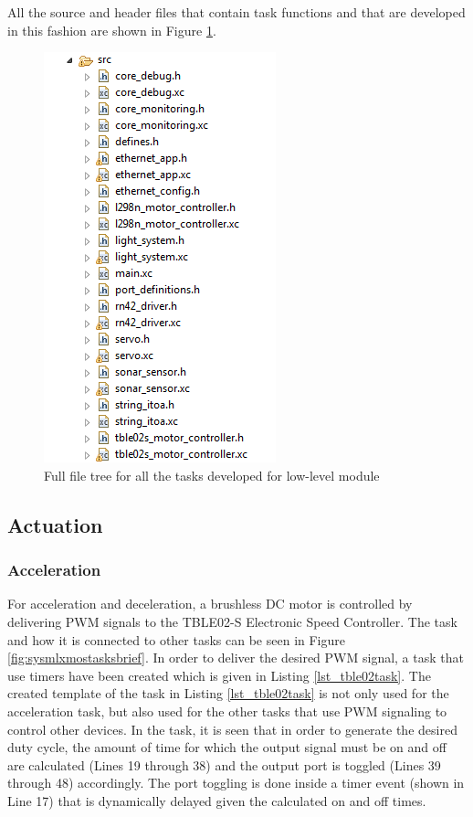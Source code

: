 All the source and header files that contain task functions and that are developed in this fashion are shown in Figure \ref{fig:fullfiletree}.
\begin{figure}[!ht]
	\centering
	\captionsetup{justification=centering}
	\includegraphics[scale=0.8]{content/images/fullfiletree.png}
	\caption{Full file tree for all the tasks developed for low-level module}
	\label{fig:fullfiletree}
\end{figure}

\subsection{Actuation}
\subsubsection{Acceleration} \label{accelerationsection}
For acceleration and deceleration, a brushless DC motor is controlled by delivering PWM signals to the TBLE02-S Electronic Speed Controller. The task and how it is connected to other tasks can be seen in Figure \ref{fig:sysmlxmostasksbrief}. In order to deliver the desired PWM signal, a task that use timers have been created which is given in Listing \ref{lst_tble02task}. The created template of the task in Listing \ref{lst_tble02task} is not only used for the acceleration task, but also used for the other tasks that use PWM signaling to control other devices. In the task, it is seen that in order to generate the desired duty cycle, the amount of time for which the output signal must be on and off are calculated (Lines 19 through 38) and the output port is toggled (Lines 39 through 48) accordingly. The port toggling is done inside a timer event (shown in Line 17) that is dynamically delayed given the calculated on and off times.

